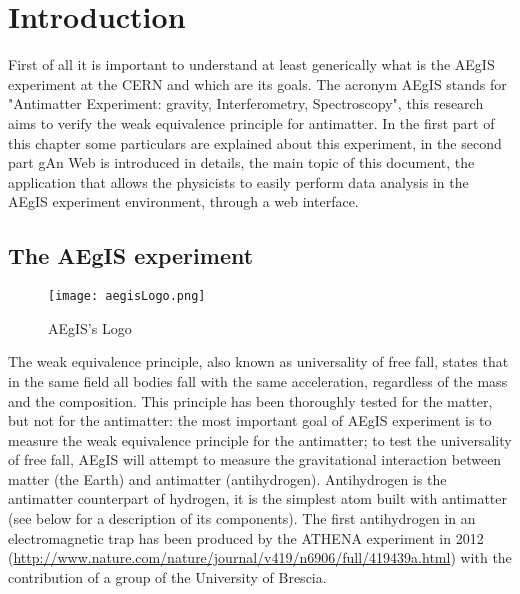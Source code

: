 
\chapter{Introduction} %

\label{Chapter1} %


First of all it is important to understand at least generically what is the AEgIS experiment at the CERN and which are its goals. The acronym AEgIS stands for "Antimatter Experiment: gravity, Interferometry, Spectroscopy", this research aims to verify the weak equivalence principle for antimatter. In the first part of this chapter some particulars are explained about this experiment, in the second part gAn Web is introduced in details, the main topic of this document, the application that allows the physicists to easily perform data analysis in the AEgIS experiment environment, through a web interface. 

\section{The AEgIS experiment}


\begin{figure}[H]
\centering
\texttt{[image: aegisLogo.png]} 
\caption{AEgIS's Logo}
\end{figure}

The weak equivalence principle, also known as universality of free fall, states that in the same field all bodies fall with the same acceleration, regardless of the mass and the composition. This principle has been thoroughly tested for the matter, but not for the antimatter: the most important goal of AEgIS experiment is to measure the weak equivalence principle for the antimatter; to test the universality of free fall, AEgIS will attempt to measure the gravitational interaction between matter (the Earth) and antimatter (antihydrogen). Antihydrogen is the antimatter counterpart of hydrogen, it is the simplest atom built with antimatter (see below for a description of its components). The first antihydrogen in an electromagnetic trap has been produced by the ATHENA experiment in 2012 (\url{http://www.nature.com/nature/journal/v419/n6906/full/419439a.html})
with the contribution of a group of the University of Brescia.

